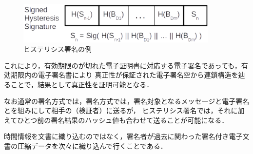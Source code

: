 \documentclass[a4paper,12pt]{jsarticle}
\begin{document}
\begin{figure}[H]%
  \begin{center}
    \includegraphics[width=100mm]{pht/hysteresis_signature.eps}
  \end{center}
  \caption{ヒステリシス署名の例}
  \label{fig:hysteresis}
\end{figure}


これにより，有効期限のが切れた電子証明書に対応する電子署名であっても，有効期限内の電子署名書により
真正性が保証された電子署名空から連鎖構造を辿ることで，結果として真正性を証明可能となる．

なお通常の署名方式では，署名方式では，署名対象となるメッセージと電子署名とを組みにして相手の（検証者）に送るが，
ヒステリシス署名では，それに加えてひとつ前の署名結果のハッシュ値も合わせて送ることが可能になる．

時間情報を文書に織り込むのではなく，署名者が過去に関わった署名付き電子文書の圧縮データを次々に織り込んで行くことである．






\end{document}
